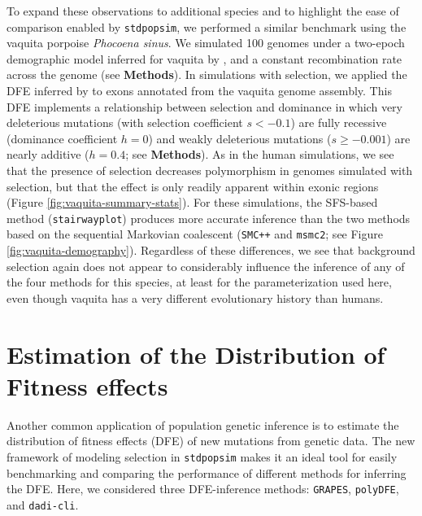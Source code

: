 \documentclass[hidelinks]{article}
\newcommand{\stdpopsim}{\texttt{stdpopsim}\xspace}
\newcommand{\msmc}{\texttt{msmc2}\xspace}
\newcommand{\stairway}{\texttt{stairwayplot}\xspace}
\newcommand{\smcpp}{\texttt{SMC++}\xspace}
\newcommand{\polydfe}{\texttt{polyDFE}\xspace}
\newcommand{\dadicli}{\texttt{dadi-cli}\xspace}
\newcommand{\grapes}{\texttt{GRAPES}\xspace}
\begin{document}
    To expand these observations to additional species and to highlight the ease of comparison enabled by \stdpopsim,
    we performed a similar benchmark using the vaquita porpoise \textit{Phocoena sinus}.
    We simulated 100 genomes under a two-epoch demographic model inferred for vaquita by \textcite{robinson2022critically},
    and a constant recombination rate across the genome (see \textbf{Methods}).
    In simulations with selection, we applied the DFE inferred by \textcite{robinson2022critically} to exons
    annotated from the vaquita genome assembly.
    This DFE implements a relationship between selection and dominance
    in which very deleterious mutations (with selection coefficient $s<-0.1$) are fully recessive
    (dominance coefficient $h=0$) and weakly deleterious mutations ($s\geq -0.001$) are nearly
    additive ($h=0.4$; see \textbf{Methods}).
    As in the human simulations, we see that the presence of selection
    decreases polymorphism in genomes simulated with selection, but that the effect
    is only readily apparent within exonic regions (Figure \ref{fig:vaquita-summary-stats}).
    For these simulations, the SFS-based method (\stairway) produces more accurate
    inference than the two methods based on the sequential Markovian coalescent
    (\smcpp and \msmc; see Figure \ref{fig:vaquita-demography}).
    Regardless of these differences, we see that background selection again does not
    appear to considerably influence the inference of any of the four methods for this species,
    at least for the parameterization used here,
    even though vaquita has a very different evolutionary history than humans.




\section*{Estimation of the Distribution of Fitness effects}
    \label{dfe}
    Another common application of population genetic inference is to estimate the distribution of fitness effects (DFE) of new mutations
    from genetic data. The new framework of modeling selection in \stdpopsim makes it an ideal tool for easily benchmarking and comparing
    the performance of different methods for inferring the DFE.
    Here, we considered three DFE-inference methods:
    \grapes \citep{galtier2016adaptive}, \polydfe \citep{tataru2020polydfe}, and \dadicli \citep{Huang2023}.
\end{document}
